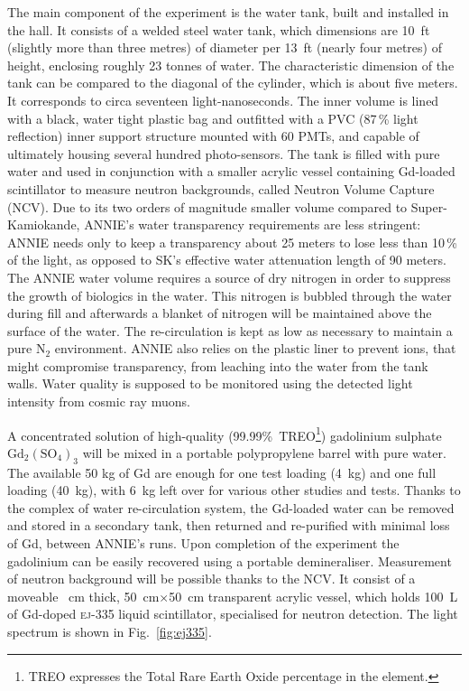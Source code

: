  The main component of the experiment is the water tank, built and installed in the hall.
 It consists of a welded steel water tank, which dimensions are 10~ft (slightly more than three metres) %
 of diameter per 13~ft (nearly four metres) of height, enclosing roughly 23 tonnes of water.
 The characteristic dimension of the tank can be compared to the diagonal of the cylinder, %
 which is about five meters.
 It corresponds to circa seventeen light-nanoseconds.
 The inner volume is lined with a black, water tight plastic bag and outfitted with %
 a PVC (87\,\% light reflection) inner support structure mounted with 60 PMTs, and capable of %
 ultimately housing several hundred photo-sensors. 
 The tank is filled with pure water and used in conjunction with a smaller %
 acrylic vessel containing Gd-loaded scintillator to measure neutron backgrounds, called %
 Neutron Volume Capture (NCV).
 Due to its two orders of magnitude smaller volume compared to Super-Kamiokande, %
 ANNIE’s water transparency requirements are less stringent: %
 ANNIE needs only to keep a transparency about 25 meters to lose less than 10\,\% of the light, %
 as opposed to SK’s effective water attenuation length of 90 meters.
 The ANNIE water volume requires a source of dry nitrogen in order to suppress the growth of %
 biologics in the water.
 This nitrogen is bubbled through the water during fill and afterwards a blanket of nitrogen %
 will be maintained above the surface of the water. 
 The re-circulation is kept as low as necessary to maintain a pure N$_2$ environment.
 ANNIE also relies on the plastic liner to prevent ions, that might compromise transparency, %
 from leaching into the water from the tank walls.
 Water quality is supposed to be monitored using the detected light intensity from cosmic ray muons.
 

 A concentrated solution of high-quality (99.99\%~TREO\footnote{TREO expresses the %
   Total Rare Earth Oxide percentage in the element.}) gadolinium sulphate %
 $\mathrm{Gd}_2(\mathrm{SO}_4)_3$ will be mixed in a portable polypropylene barrel with pure water.
 The available 50 kg of Gd are enough for one test loading (4~kg) and %
 one full loading (40~kg), with 6~kg left over for various other studies and tests.
 Thanks to the complex of water re-circulation system, the Gd-loaded water can be removed %
 and stored in a secondary tank, then returned and re-purified with minimal loss of Gd, %
 between ANNIE's runs.
 Upon completion of the experiment the gadolinium can be easily recovered using a %
 portable demineraliser.
 Measurement of neutron background will be possible thanks to the NCV.
 It consist of a moveable ~cm thick, 50~cm$\times$50~cm transparent acrylic vessel, %
 which holds 100~L of Gd-doped \textsc{ej-335} liquid scintillator, %
 specialised for neutron detection.
 The light spectrum is shown in Fig.~\ref{fig:ej335}.

